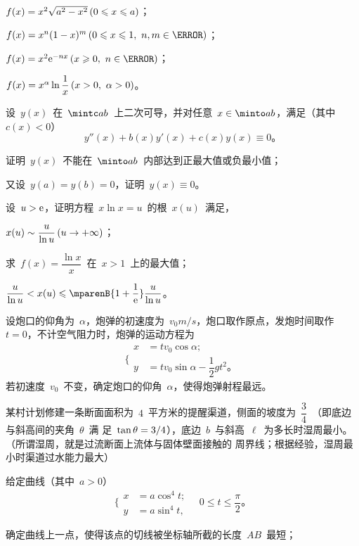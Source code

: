 \begin{exercise}
\begin{exlistcols}
  \item $f(x)=x^2\sqrt{a^2-x^2}\mcond{0\leq x\leq a}$；
  \item $f(x)=x^n(1-x)^m\mcond{0\leq x\leq 1,~n,m\in\mN}$；
  \item $f(x)=x^2\me^{-nx}\mcond{x\geq0,~n\in\mN}$；
  \item $f(x)=x^\alpha\ln\dfrac1x\mcond{x>0,~\alpha>0}$。
\end{exlistcols}
\item 设~$y(x)$~在~$\mintc ab$~上二次可导，并对任意~$x\in\minto ab$，满足（其中~$c(x)<0$）
\[
  y''(x)+b(x)y'(x)+c(x)y(x)\equiv 0 。
\]
\begin{exlist}
  \item 证明~$y(x)$~不能在~$\minto ab$~内部达到正最大值或负最小值；
  \item 又设~$y(a)=y(b)=0$，证明~$y(x)\equiv0$。
\end{exlist}
\item 设~$u>\mathrm e$，证明方程~$x\ln x=u$~的根~$x(u)$~满足，
\begin{exlistcols}
  \item $x(u)\sim\dfrac u{\ln u}\mcond{u\to\pinf}$；
  \item 求~$f(x)=\dfrac{\ln x}x$~在~$x>1$~上的最大值；
  \item $\dfrac u{\ln u}<x(u)\leq\mparenB{1+\dfrac1\me}\dfrac u{\ln u}$。
\end{exlistcols}
\item 设炮口的仰角为~$\alpha$，炮弹的初速度为~$v_0\si{m/s}$，炮口取作原点，发炮时间取作~$t=0$，不计空气阻力时，炮弹的运动方程为
\[
  \Biggl\{\begin{aligned}
    x&=tv_0\cos\alpha;\\
    y&=tv_0\sin\alpha-\dfrac12gt^2 。
  \end{aligned}
\]
若初速度~$v_0$~不变，确定炮口的仰角~$\alpha$，使得炮弹射程最远。
\item 某村计划修建一条断面面积为~$4$~平方米的提醒渠道，侧面的坡度为~$\dfrac34$~（即底边与斜高间的夹角~$\theta$~满
足~$\tan\theta=3\mathord{/}4$），底边~$b$~与斜高~$\ell$~为多长时湿周最小。（所谓湿周，就是过流断面上流体与固体壁面接触的
周界线；根据经验，湿周最小时渠道过水能力最大）
\item 给定曲线（其中~$a>0$）
\[
  \biggl\{\begin{aligned}
    x&= a\cos^4t; \\
    y&= a\sin^4t,
  \end{aligned}\quad 0\leq t\leq\dfrac\pi2 。
\]
\begin{exlist}
  \item 确定曲线上一点，使得该点的切线被坐标轴所截的长度~$AB$~最短；

\end{exlist}
\end{exercise}
